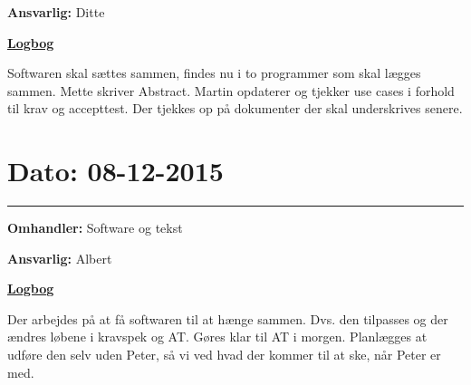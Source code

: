 \textbf{Ansvarlig:} Ditte 

\underline{\textbf{Logbog}}

Softwaren skal sættes sammen, findes nu i to programmer som skal lægges sammen. 
Mette skriver Abstract. 
Martin opdaterer og tjekker use cases i forhold til krav og accepttest. Der tjekkes op på dokumenter der skal underskrives senere.  
\\

\section{Dato: 08-12-2015}
\hrule
\textbf{Omhandler:} Software og tekst

\textbf{Ansvarlig:} Albert 

\underline{\textbf{Logbog}}

Der arbejdes på at få softwaren til at hænge sammen. Dvs. den tilpasses og der ændres løbene i kravspek og AT. Gøres klar til AT i morgen. Planlægges at udføre den selv uden Peter, så vi ved hvad der kommer til at ske, når Peter er med.   
\\